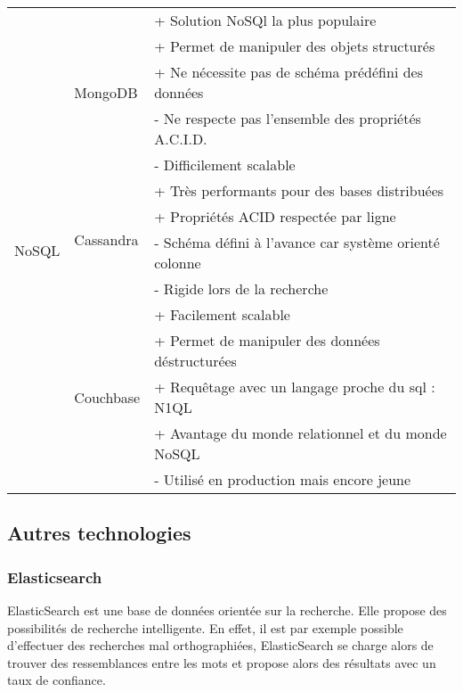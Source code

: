 \begin{center}
\begin{tabular}{|l|l|l|}
            \multirow{15}{*}{NoSQL} & \multirow{5}{*}{MongoDB} & + Solution NoSQl la plus populaire \\
            & & + Permet de manipuler des objets structurés \\
            & & + Ne nécessite pas de schéma prédéfini des données \\
            & & - Ne respecte pas l’ensemble des propriétés A.C.I.D. \\
            & & - Difficilement scalable \\ \cline{2-3}
            & \multirow{4}{*}{Cassandra} & + Très performants pour des bases distribuées \\
            & & + Propriétés ACID respectée par ligne \\
            & & - Schéma défini à l’avance car système orienté colonne \\
            & & - Rigide lors de la recherche \\ \cline{2-3}
            & \multirow{6}{*}{Couchbase} & + Facilement scalable \\
            & & + Permet de manipuler des données déstructurées \\
            & & + Requêtage avec un langage proche du sql : N1QL \\
            & & + Avantage du monde relationnel et du monde NoSQL \\
            & & - Utilisé en production mais encore jeune \\
            \hline
        \end{tabular}
        \end{center}


    \subsection{Autres technologies}
    \label{subsec:autrestechno}

        \subsubsection{Elasticsearch}
        \label{subsubsec:elastic}
        ElasticSearch est une base de données orientée sur la recherche. Elle propose des possibilités de recherche intelligente.
        En effet, il est par exemple possible d'effectuer des recherches mal orthographiées, ElasticSearch se charge alors de trouver
        des ressemblances entre les mots et propose alors des résultats avec un taux de confiance.

